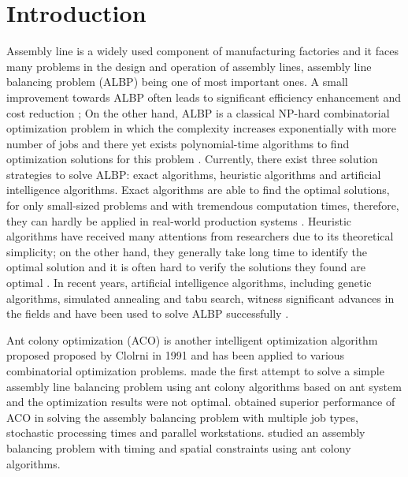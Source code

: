 
\section{Introduction}
Assembly line is a widely used component of manufacturing factories and it faces many problems  in the design and operation of assembly lines, assembly line balancing problem (ALBP) being one of most important ones.
A small improvement towards ALBP often leads to significant efficiency enhancement and cost reduction \citep{salveson1};
On the other hand, ALBP is a classical NP-hard combinatorial optimization problem in which the complexity increases exponentially with more number of jobs and there yet exists polynomial-time algorithms to find optimization solutions for this problem \citep{kilincci2}.
Currently, there exist three solution strategies to solve ALBP: exact algorithms, heuristic algorithms and artificial intelligence algorithms.
Exact algorithms are able to find the optimal solutions, for only small-sized problems and with tremendous computation times, therefore, they can hardly be applied in real-world production systems \citep{scholl3, peeter4}.
Heuristic algorithms have received many attentions from researchers due to its theoretical simplicity; on the other hand, they generally take long time to identify the optimal solution and it is often hard to verify the solutions they found are optimal \citep{ponnambalam5}.
In recent years, artificial intelligence algorithms, including genetic algorithms, simulated annealing and tabu search, witness significant advances in the fields and have been used to solve ALBP successfully \citep{azcan6, azcan7}.

Ant colony optimization (ACO) is another intelligent optimization algorithm proposed proposed by Clolrni \citep{inproceedings8} in 1991 and has been applied to various combinatorial optimization problems.
\citet{bautista9} made the first attempt to solve a simple assembly line balancing problem using ant colony algorithms based on ant system and the optimization results were not optimal.
\citet{patrick10} obtained superior performance of ACO in solving the assembly balancing problem with multiple job types, stochastic processing times and parallel workstations.
\citet{bautista11} studied an assembly balancing problem with timing and spatial constraints using ant colony algorithms.

